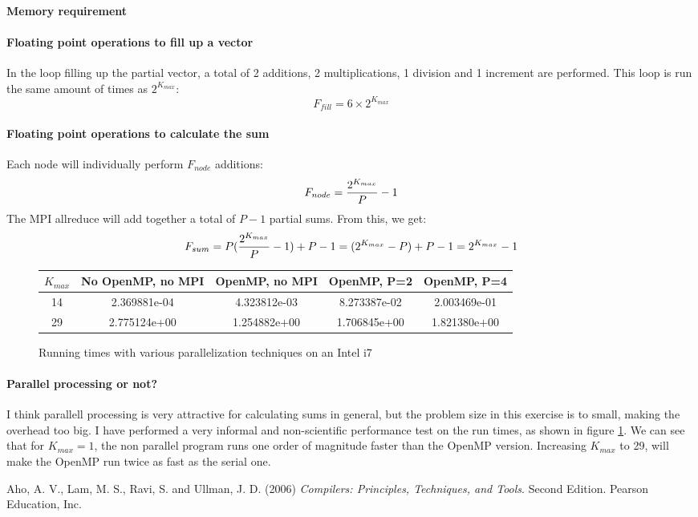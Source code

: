 \documentclass{article}
\begin{document}
\paragraph{Memory requirement}

\paragraph{Floating point operations to fill up a vector}
In the loop filling up the partial vector, a total of 2 additions, 2 multiplications, 1 division and 1 increment are performed. This loop is run the same amount of times as $2^{K_{max}}$:
\begin{equation}
	F_{fill} = 6 \times 2^{K_{max}}
\end{equation}

\paragraph{Floating point operations to calculate the sum}
Each node will individually perform $F_{node}$ additions:
\begin{equation}
	F_{node} = {2^{K_{max}} \over P} - 1
\end{equation}
The MPI allreduce will add together a total of $P-1$ partial sums. From this, we get:
\begin{equation}
	F_{sum} = P({2^{K_{max}} \over P} - 1) + P -1 = (2^{K_{max}} - P) + P -1 = 2^{K_{max}} - 1
\end{equation}

\begin{figure}[h]
\centering
\begin{tabular}{c | c c c c}
	\hline
	$K_{max}$ & No OpenMP, no MPI & OpenMP, no MPI & OpenMP, P=2 & OpenMP, P=4 \\
	\hline
	\hline
	14	& 2.369881e-04 & 4.323812e-03 & 8.273387e-02 & 2.003469e-01 \\
	29 	& 2.775124e+00	& 1.254882e+00	& 1.706845e+00 & 1.821380e+00 \\
\end{tabular}
	\caption{Running times with various parallelization techniques on an Intel i7}
	\label{fig:time}
\end{figure}
\paragraph{Parallel processing or not?} I think parallell processing is very attractive for calculating sums in general, but the problem size in this exercise is to small, making the overhead too big. I have performed a very informal and non-scientific performance test on the run times, as shown in figure \ref{fig:time}. We can see that for $K_{max}=1$, the non parallel program runs one order of magnitude faster than the OpenMP version. Increasing $K_{max}$ to 29, will make the OpenMP run twice as fast as the serial one.

\newpage
\begin{thebibliography}{9}
	
	Aho, A. V., Lam, M. S., Ravi, S. and Ullman, J. D.
	(2006)
	\emph{Compilers: Principles, Techniques, and Tools}.
	Second Edition. 
	Pearson Education, Inc.

\end{thebibliography}
\end{document}
